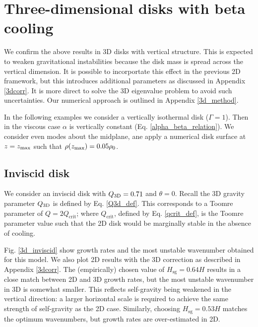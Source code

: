 \section{Three-dimensional disks with beta cooling}\label{3ddisk}
We confirm the above results in 3D disks with vertical
structure. This is expected to weaken gravitational instabilities
because the disk mass is spread across the vertical dimension. It is
possible to incorportate this effect in the previous 2D framework, but this
introduces additional parameters as discussed in Appendix
\ref{3dcorr}. It is more direct to solve the 3D eigenvalue problem to
avoid such uncertainties. Our numerical approach is outlined in Appendix
\ref{3d_method}. 


In the following examples we consider a vertically isothermal disk
($\Gamma=1$). Then in the viscous case $\alpha$ is vertically
constant (Eq. \ref{alpha_beta_relation}). We consider even modes about
the midplane, ane apply a numerical disk surface at $z=z_\mathrm{max}$ such
that $\rho(z_\mathrm{max})=0.05\rho_0$.    

\subsection{Inviscid disk}

We consider an inviscid disk with $Q_\mathrm{3D}=0.71$ and $\theta=0$. 
Recall the 3D gravity parameter $Q_\mathrm{3D}$ is defined by 
Eq. \ref{Q3d_def}. This corresponds to a Toomre parameter of
$Q=2Q_\mathrm{crit}$; where $Q_\mathrm{crit}$, defined by
Eq. \ref{qcrit_def}, is the Toomre parameter value such that the 2D
disk would be marginally stable in the absence of cooling. 

Fig. \ref{3d_inviscid} show growth rates and the most unstable
wavenumber obtained for this model. We also plot 2D
results with the 3D correction as described in Appendix
\ref{3dcorr}. The (empirically) chosen value of
$H_\mathrm{sg}=0.64H$ results in a close match between 2D and 3D
growth rates, but the most unstable wavenumber in 3D is somewhat smaller. 
This reflects self-gravity being weakened in the vertical 
direction: a larger horizontal scale is required to achieve the same
strength of self-gravity as the 2D case. Similarly, 
choosing $H_\mathrm{sg}=0.53H$ matches the optimum wavenumbers, but
growth rates are over-estimated in 2D.    

